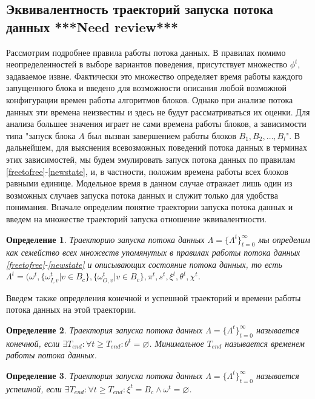 \documentclass[10pt,a4paper]{article}
\newtheorem{defen}{Определение}
\begin{document}
\subsection{Эквивалентность траекторий запуска потока данных \textbf{***Need review***}}
  Рассмотрим подробнее правила работы потока данных. В правилах помимо неопределенностей в выборе вариантов поведения, присутствует множество $\phi^t$, задаваемое извне.
  Фактически это множество определяет время работы каждого запущенного блока и введено для возможности описания любой возможной конфигурации времен работы алгоритмов блоков.
  Однако при анализе потока данных эти времена неизвестны и здесь не будут рассматриваться их оценки. Для анализа большее значения играет не сами времена работы блоков, а
  зависимости типа "запуск блока $A$ был вызван завершением работы блоков $B_1, B_2, \dots, B_l$".
  В дальнейшем, для выяснения всевозможных поведений потока данных в терминах этих зависимостей,
  мы будем эмулировать запуск потока данных по правилам \eqref{freetofree}-\eqref{newstate}, и, в частности, положим времена работы всех блоков равными единице.
  Модельное время в данном случае отражает лишь один из возможных случаев запуска потока данных и служит только для удобства понимания.
  Вначале определим понятие траектории запуска потока данных и введем на множестве траекторий запуска отношение эквивалентности.
  
  \begin{defen}
    Траекторию запуска потока данных $\Lambda = \{\Lambda^t\}_{t=0}^{\infty}$ мы определим как семейство всех множеств упомянутых в
    правилах работы потока данных \eqref{freetofree}-\eqref{newstate} и описывающих состояние потока данных,
    то есть $\Lambda^t = (\omega^t, \{\omega^t_{I, v} \vert v \in B_c\}, \{\omega^t_{O, v} \vert v \in B_c\}, \pi^t, s^t, \xi^t, \theta^t, \chi^t$.
  \end{defen}
  
  Введем также определения конечной и успешной траекторий и времени работы потока данных на этой траектории.
  \begin{defen}
    Траектория запуска потока данных $\Lambda = \{\Lambda^t\}_{t=0}^{\infty}$ называется конечной, если
    $\exists T_{end}: \forall t \geq T_{end}: \theta^t = \varnothing$. Минимальное $T_{end}$ называется временем работы потока данных.
    \label{def:trajectory_finite}
  \end{defen}
  
  \begin{defen}
    Траектория запуска потока данных $\Lambda = \{\Lambda^t\}_{t=0}^{\infty}$ называется успешной, если
    $\exists T_{end}: \forall t \geq T_{end} : \xi^t = B_c \wedge \omega^t = \varnothing$.
    \label{def:trajectory_success}
  \end{defen}
  
\end{document}
